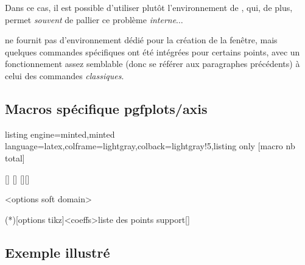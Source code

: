 \documentclass[11pt,a4paper]{ltxdoc}
\begin{document}
Dans ce cas, il est possible d'utiliser plutôt l'environnement  de , qui, de plus, permet \textit{souvent} de pallier ce problème \textit{interne}$\ldots$

 ne fournit pas d'environnement dédié pour la création de la fenêtre, mais quelques commandes spécifiques ont été intégrées pour certains points, avec un fonctionnement assez semblable (donc se référer aux paragraphes précédents) à celui des commandes \textit{classiques}.

\subsection{Macros spécifique pgfplots/axis}

\begin{tcblisting}{listing engine=minted,minted language=latex,colframe=lightgray,colback=lightgray!5,listing only}
[macro nb total]

[\myxcoord]
[\myycoord]
[\myxcoord][\myycoord]

<options soft domain>

\addplotspline(*)[options tikz]<coeffs>{liste des points support}[\monspline]
\end{tcblisting}

\subsection{Exemple illustré}
\end{document}
